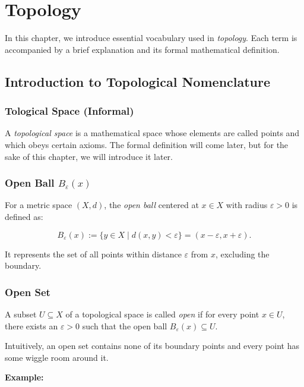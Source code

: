 \chapter{Topology}

In this chapter, we introduce essential vocabulary used in \emph{topology}. Each term is accompanied by a 
brief explanation and its formal mathematical definition.

\section{Introduction to Topological Nomenclature}

\subsection{Tological Space (Informal)}

A \emph{topological space} is a mathematical space whose elements are called points and which obeys certain axioms.
The formal definition will come later, but for the sake of this chapter, we will introduce it later.

\subsection{Open Ball \texorpdfstring{\( B_\varepsilon(x) \)}{}} 

For a metric space \( (X, d) \), the \emph{open ball} centered at \( x \in X \) with radius \( \varepsilon > 0 \) is defined as: 
	      
\[
	B_\varepsilon(x) := \{ y \in X \mid d(x, y) < \varepsilon \} = (x - \varepsilon, x + \varepsilon).
\]

It represents the set of all points within distance \( \varepsilon \) from \(x\), excluding the boundary.

\subsection{Open Set}
	     
A subset \( U \subseteq X \) of a topological space is called \emph{open} if for every point \( x \in U \), there exists an \( \varepsilon > 0 \) 
such that the open ball \( B_\varepsilon(x) \subseteq U \). 

Intuitively, an open set contains none of its boundary points and every point has some 
wiggle room around it.

\textbf{Example:}

